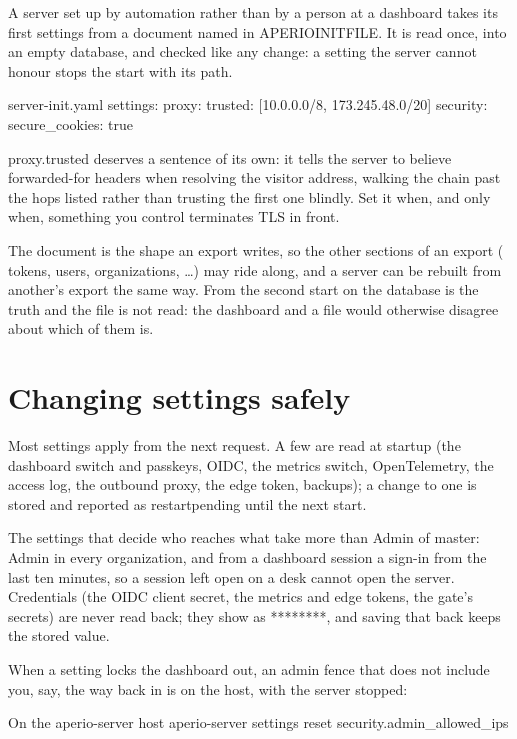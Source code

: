 \documentclass[11pt,a4paper,oneside]{book}
\newcommand{\aperiobreakableunderscore}{\textunderscore\allowbreak}
\newcommand{\aperiocodebreaks}{\XeTeXinterchartokenstate=1 }
\newcommand{\aperiocodebreaks}{}
\DeclareRobustCommand{\code}[1]{{\ttfamily\small\aperiocodebreaks
  \let\_\aperiobreakableunderscore#1}}
\begin{document}
A server set up by automation rather than by a person at a dashboard takes
its first settings from a document named in \code{APERIO\_INIT\_FILE}. It is
read once, into an empty database, and checked like any change: a setting the
server cannot honour stops the start with its path.

\begin{codecard}[aperioyaml]{server-init.yaml}
settings:
  proxy:
    trusted: [10.0.0.0/8, 173.245.48.0/20]
  security:
    secure_cookies: true
\end{codecard}

\code{proxy.trusted} deserves a sentence of its own: it tells the server to
believe forwarded-for headers when resolving the visitor address, walking the
chain past the hops listed rather than trusting the first one blindly. Set it
when, and only when, something you control terminates TLS in front.

The document is the shape an export writes, so the other sections of an
export (\code{tokens}, \code{users}, \code{organizations}, \ldots) may ride
along, and a server can be rebuilt from another's export the same way. From
the second start on the database is the truth and the file is not read: the
dashboard and a file would otherwise disagree about which of them is.

\section{Changing settings safely}

Most settings apply from the next request. A few are read at startup (the
dashboard switch and passkeys, OIDC, the metrics switch, OpenTelemetry, the
access log, the outbound proxy, the edge token, backups); a change to one is
stored and reported as \code{restart\_pending} until the next start.

The settings that decide who reaches what take more than Admin of master:
Admin in every organization, and from a dashboard session a sign-in from the
last ten minutes, so a session left open on a desk cannot open the server.
Credentials (the OIDC client secret, the metrics and edge tokens, the gate's
secrets) are never read back; they show as \code{********}, and saving that
back keeps the stored value.

When a setting locks the dashboard out, an admin fence that does not include
you, say, the way back in is on the host, with the server stopped:

\begin{codecard}[aperiosh]{On the aperio-server host}
aperio-server settings reset security.admin_allowed_ips
\end{codecard}
\end{document}
